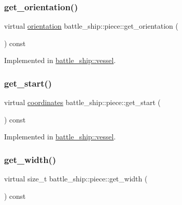 \subsubsection{\texorpdfstring{get\+\_\+orientation()}{get\_orientation()}}
{\footnotesize\ttfamily virtual \hyperlink{namespacebattle__ship_aed87488f0a73f0d0679fe343fb61c784}{orientation} battle\+\_\+ship\+::piece\+::get\+\_\+orientation (\begin{DoxyParamCaption}{ }\end{DoxyParamCaption}) const\hspace{0.3cm}{\ttfamily [pure virtual]}}



Implemented in \hyperlink{classbattle__ship_1_1vessel_a698c7811878e56b7ba7eb6d88e6ac13f}{battle\+\_\+ship\+::vessel}.

\mbox{\label{classbattle__ship_1_1piece_ab5010cea30b96f5afc758b2a9d0d43bc}} 
\subsubsection{\texorpdfstring{get\+\_\+start()}{get\_start()}}
{\footnotesize\ttfamily virtual \hyperlink{structbattle__ship_1_1coordinates}{coordinates} battle\+\_\+ship\+::piece\+::get\+\_\+start (\begin{DoxyParamCaption}{ }\end{DoxyParamCaption}) const\hspace{0.3cm}{\ttfamily [pure virtual]}}



Implemented in \hyperlink{classbattle__ship_1_1vessel_aba133e1debe50caa9cbbae5e867b5995}{battle\+\_\+ship\+::vessel}.

\mbox{\label{classbattle__ship_1_1piece_abd5b9073f2fa6201c4dbc35b43942d2f}} 
\subsubsection{\texorpdfstring{get\+\_\+width()}{get\_width()}}
{\footnotesize\ttfamily virtual size\+\_\+t battle\+\_\+ship\+::piece\+::get\+\_\+width (\begin{DoxyParamCaption}{ }\end{DoxyParamCaption}) const\hspace{0.3cm}{\ttfamily [pure virtual]}}



